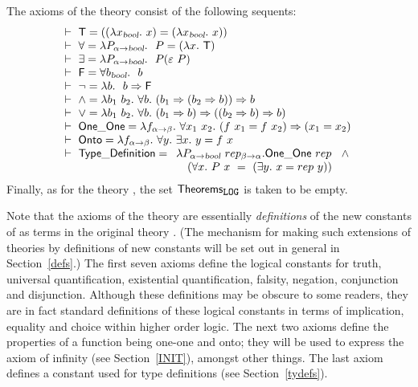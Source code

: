 The axioms of the theory  consist of the following
sequents:
\[
\begin{array}{l}

\ \vdash\  {\sf T}       =  ((\lambda x_{\textsl{bool}}.\ x) =
               (\lambda x_{\textsl{bool}}.\ x))    \\
\ \vdash\  \forall  =  \lambda P_{\alpha{\to}\textsl{bool}}.\ \ P =
                    (\lambda x.\ {\sf T} ) \\
\ \vdash\  \exists  =  \lambda P_{\alpha{\to}\textsl{bool}}.\ \
                    P({\varepsilon}\ P) \\
\ \vdash\  {\sf F}       =  \forall b_{\textsl{bool}}.\ \ b  \\
\ \vdash\  \neg    =  \lambda b.\ \ b \Rightarrow {\sf F} \\
\ \vdash\  {\wedge}  =  \lambda b_1\ b_2.\ \forall b.\ 
                     (b_1\Rightarrow (b_2 \Rightarrow b)) \Rightarrow b \\
\ \vdash\  {\vee}  =  \lambda b_1\ b_2.\ \forall b.\ 
                   (b_1 \Rightarrow b)\Rightarrow ((b_2 \Rightarrow b) \Rightarrow b) \\
\ \vdash\  {\sf One\_One}  =  \lambda f_{\alpha {\to}\beta}.\ \forall x_1\ x_2.\ 
                    (f\ x_1 = f\ x_2)  \Rightarrow (x_1 = x_2) \\
\ \vdash\  {\sf Onto}  =  \lambda f_{\alpha{\to}\beta}.\ 
                  \forall y.\ \exists x.\  y = f\ x \\
\ \vdash\  {\sf Type\_Definition}  =   \begin{array}[t]{l}
                  \lambda P_{\alpha{\to}\textsl{bool}}\
                  rep_{\beta{\to}\alpha}.
                  {\sf One\_One}\ rep\ \ \wedge{}\\
                  \quad(\forall x.\ P\ x \ =\ (\exists y.\  x = rep\ y))
                  \end{array}
\end{array}
\]
Finally, as for the theory , the set ${\sf
Theorems}_{}$ is taken to be empty.

Note that the axioms of the theory  are essentially {\em
definitions\/} of the new constants of \theory{LOG} as terms in the
original theory \theory{MIN}. (The mechanism for making such
extensions of theories by definitions of new constants will be set out
in general in Section~\ref{defs}.) The first seven axioms define the
logical constants for truth, universal quantification, existential
quantification, falsity, negation, conjunction and disjunction.
Although these definitions may be obscure to some readers, they are in
fact standard definitions of these logical constants in terms of
implication, equality and choice within higher order logic. The next
two axioms define the properties of a function being one-one and onto;
they will be used to express the axiom of infinity (see
Section~\ref{INIT}), amongst other things. The last axiom defines a
constant used for type definitions (see Section~\ref{tydefs}).

